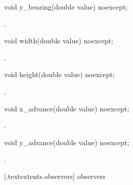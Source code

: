 \begin{itemdecl}
    void y_bearing(double value) noexcept;
\end{itemdecl}
\begin{itemdescr}
	\pnum
	\postconditions
	.
	
\end{itemdescr}

\begin{itemdecl}
    void width(double value) noexcept;
\end{itemdecl}
\begin{itemdescr}
	\pnum
	\postconditions
	.
	
\end{itemdescr}
	
\begin{itemdecl}
    void height(double value) noexcept;
\end{itemdecl}
\begin{itemdescr}
	\pnum
	\postconditions
	.
	
\end{itemdescr}
	
\begin{itemdecl}
    void x_advance(double value) noexcept;
\end{itemdecl}
\begin{itemdescr}
	\pnum
	\postconditions
	.
	
\end{itemdescr}
	
\begin{itemdecl}
    void y_advance(double value) noexcept;
\end{itemdecl}
\begin{itemdescr}
	\pnum
	\postconditions
	.
	
\end{itemdescr}

 [\iotwod.textextents.observers]{ observers}

